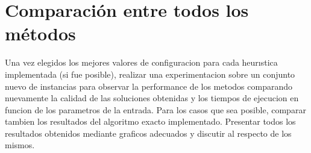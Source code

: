 \section{Comparaci\'on entre todos los m\'etodos}

Una vez elegidos los mejores valores de configuracion para cada heurıstica implementada (si fue posible), realizar una experimentacion sobre un conjunto nuevo de instancias para observar la performance de los metodos comparando nuevamente la calidad de las soluciones obtenidas y los tiempos de ejecucion en funcion de los parametros de la entrada. Para los casos que sea posible, comparar tambien los resultados del algoritmo exacto implementado. Presentar todos los resultados obtenidos mediante graficos adecuados y discutir al respecto de los mismos.
